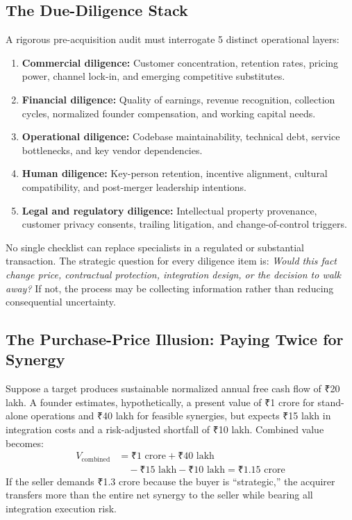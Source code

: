 \subsection{The Due-Diligence Stack}
\label{sec:due_diligence_stack}

A rigorous pre-acquisition audit must interrogate 5 distinct operational layers:
\begin{enumerate}
    \item \textbf{Commercial diligence:} Customer concentration, retention rates, pricing power, channel lock-in, and emerging competitive substitutes.
    \item \textbf{Financial diligence:} Quality of earnings, revenue recognition, collection cycles, normalized founder compensation, and working capital needs.
    \item \textbf{Operational diligence:} Codebase maintainability, technical debt, service bottlenecks, and key vendor dependencies.
    \item \textbf{Human diligence:} Key-person retention, incentive alignment, cultural compatibility, and post-merger leadership intentions.
    \item \textbf{Legal and regulatory diligence:} Intellectual property provenance, customer privacy consents, trailing litigation, and change-of-control triggers.
\end{enumerate}

No single checklist can replace specialists in a regulated or substantial transaction. The strategic question for every diligence item is: \textit{Would this fact change price, contractual protection, integration design, or the decision to walk away?} If not, the process may be collecting information rather than reducing consequential uncertainty.

\subsection{The Purchase-Price Illusion: Paying Twice for Synergy}
\label{sec:purchase_price_illusion_paying_twice}

Suppose a target produces sustainable normalized annual free cash flow of ₹20 lakh. A founder estimates, hypothetically, a present value of ₹1 crore for stand-alone operations and ₹40 lakh for feasible synergies, but expects ₹15 lakh in integration costs and a risk-adjusted shortfall of ₹10 lakh. Combined value becomes:
\begin{equation}
\label{eq:combined_acquisition_value}
\begin{aligned}
V_{\text{combined}} &= \text{₹1 crore} + \text{₹40 lakh} \\
&\quad - \text{₹15 lakh} - \text{₹10 lakh} = \text{₹1.15 crore}
\end{aligned}
\end{equation}
If the seller demands ₹1.3 crore because the buyer is ``strategic,'' the acquirer transfers more than the entire net synergy to the seller while bearing all integration execution risk.

